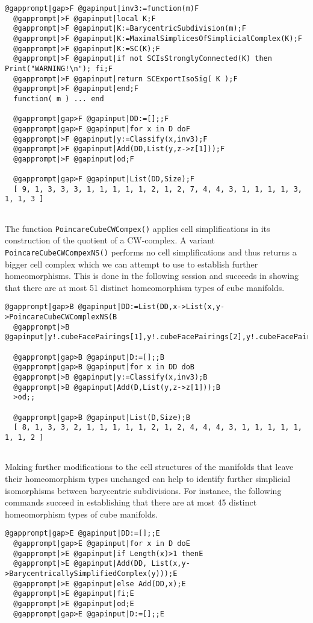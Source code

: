 \documentclass[a4paper,11pt]{report}
\begin{document}
{{\begin{Verbatim}[commandchars=@|F,fontsize=\small,frame=single,label=Example]
  @gapprompt|gap>F @gapinput|inv3:=function(m)F
  @gapprompt|>F @gapinput|local K;F
  @gapprompt|>F @gapinput|K:=BarycentricSubdivision(m);F
  @gapprompt|>F @gapinput|K:=MaximalSimplicesOfSimplicialComplex(K);F
  @gapprompt|>F @gapinput|K:=SC(K);F
  @gapprompt|>F @gapinput|if not SCIsStronglyConnected(K) then Print("WARNING!\n"); fi;F
  @gapprompt|>F @gapinput|return SCExportIsoSig( K );F
  @gapprompt|>F @gapinput|end;F
  function( m ) ... end
  
  @gapprompt|gap>F @gapinput|DD:=[];;F
  @gapprompt|gap>F @gapinput|for x in D doF
  @gapprompt|>F @gapinput|y:=Classify(x,inv3);F
  @gapprompt|>F @gapinput|Add(DD,List(y,z->z[1]));F
  @gapprompt|>F @gapinput|od;F
  
  @gapprompt|gap>F @gapinput|List(DD,Size);F
  [ 9, 1, 3, 3, 3, 1, 1, 1, 1, 1, 2, 1, 2, 7, 4, 4, 3, 1, 1, 1, 1, 3, 1, 1, 3 ]
  
\end{Verbatim}
 The function \texttt{PoincareCubeCWCompex()} applies cell simplifications in its construction of the quotient of a
CW-complex. A variant \texttt{PoincareCubeCWCompexNS()} performs no cell simplifications and thus returns a bigger cell complex which
we can attempt to use to establish further homeomorphisms. This is done in the
following session and succeeds in showing that there are at most 51 distinct
homeomorphism types of cube manifolds. 
\begin{Verbatim}[commandchars=@|B,fontsize=\small,frame=single,label=Example]
  @gapprompt|gap>B @gapinput|DD:=List(DD,x->List(x,y->PoincareCubeCWComplexNS(B
  @gapprompt|>B @gapinput|y!.cubeFacePairings[1],y!.cubeFacePairings[2],y!.cubeFacePairings[3])));;B
  
  @gapprompt|gap>B @gapinput|D:=[];;B
  @gapprompt|gap>B @gapinput|for x in DD doB
  @gapprompt|>B @gapinput|y:=Classify(x,inv3);B
  @gapprompt|>B @gapinput|Add(D,List(y,z->z[1]));B
  >od;;
  
  @gapprompt|gap>B @gapinput|List(D,Size);B
  [ 8, 1, 3, 3, 2, 1, 1, 1, 1, 1, 2, 1, 2, 4, 4, 4, 3, 1, 1, 1, 1, 1, 1, 1, 2 ]
  
\end{Verbatim}
 Making further modifications to the cell structures of the manifolds that
leave their homeomorphism types unchanged can help to identify further
simplicial isomorphisms between barycentric subdivisions. For instance, the
following commands succeed in establishing that there are at most 45 distinct
homeomorphism types of cube manifolds. 
\begin{Verbatim}[commandchars=@|E,fontsize=\small,frame=single,label=Example]
  @gapprompt|gap>E @gapinput|DD:=[];;E
  @gapprompt|gap>E @gapinput|for x in D doE
  @gapprompt|>E @gapinput|if Length(x)>1 thenE
  @gapprompt|>E @gapinput|Add(DD, List(x,y->BarycentricallySimplifiedComplex(y)));E
  @gapprompt|>E @gapinput|else Add(DD,x);E
  @gapprompt|>E @gapinput|fi;E
  @gapprompt|>E @gapinput|od;E
  @gapprompt|gap>E @gapinput|D:=[];;E
  

\end{Verbatim}}}
\end{document}
